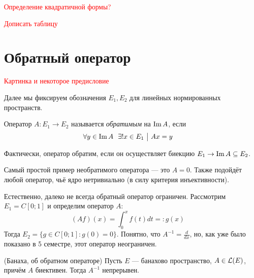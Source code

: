 \textcolor{red}{Определение квадратичной формы?}

\textcolor{red}{Дописать таблицу}

\section{Обратный оператор}

\textcolor{red}{Картинка и некоторое предисловие}

\begin{note}
	Далее мы фиксируем обозначения $E_1, E_2$ для линейных нормированных пространств.
\end{note}

\begin{definition}
	Оператор $A \colon E_1 \to E_2$ называется \textit{обратимым} на $\operatorname{Im} A$, если
	\[
		\forall y \in \im A\ \ \exists ! x \in E_1 \such Ax = y
	\]
\end{definition}

\begin{anote}
	Фактически, оператор обратим, если он осуществляет биекцию $E_1 \to \operatorname{Im} A \subseteq E_2$.
\end{anote}

\begin{example}
	Самый простой пример необратимого оператора --- это $A = 0$. Также подойдёт любой оператор, чьё ядро нетривиально (в силу критерия инъективности).
\end{example}

\begin{example}
	Естественно, далеко не всегда обратный оператор ограничен. Рассмотрим $E_1 = C[0; 1]$ и определим оператор $A$:
	\[
		(Af)(x) = \int_0^x f(t)dt =: g(x)
	\]
	Тогда $E_2 = \{g \in C[0; 1] \colon g(0) = 0\}$. Понятно, что $A^{-1} = \frac{d}{dx}$, но, как уже было показано в 5 семестре, этот оператор неограничен.
\end{example}

\begin{theorem} (Банаха, об обратном операторе)
	Пусть $E$ --- банахово пространство, $A \in \mathcal{L}(E)$, причём $A$ биективен. Тогда $A^{-1}$ непрерывен.
\end{theorem}